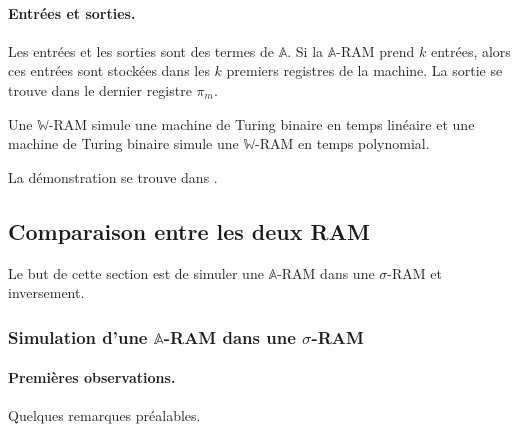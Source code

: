 \documentclass{report}
\newcommand{\bbA}{\mathbb{A}}
\begin{document}
		
			\paragraph{Entrées et sorties.}
			Les entrées et les sorties sont des termes de $\bbA$. Si la $\bbA$-RAM prend $k$ entrées, alors ces entrées sont stockées dans les $k$ premiers registres de la machine. La sortie se trouve dans le dernier registre $\pi_m$. 
		
		
		\begin{theorem}
			\label{thm:ARAMs_turing_complete}
			Une $\mathbb{W}$-RAM simule une machine de Turing binaire en temps linéaire et une machine de Turing binaire simule une $\mathbb{W}$-RAM en temps polynomial.
		\end{theorem}
			
		La démonstration se trouve dans \cite{Leivant1995}.
		
		
		
		
		\subsection{Comparaison entre les deux RAM}
		\label{subsec:comparaison_RAMs}

			Le but de cette section est de simuler une $\bbA$-RAM dans une $\sigma$-RAM et inversement.
			
			\subsubsection{Simulation d'une $\bbA$-RAM dans une $\sigma$-RAM}
			\label{subsubsec:sim_A_RAM_sigma_RAM}
	
				
				\paragraph{Premières observations.}
				\label{par:premieres_observations}
				Quelques remarques préalables.
				
\end{document}
